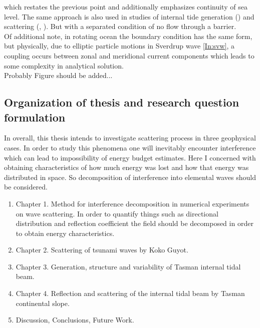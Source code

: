 which restates the previous point and additionally emphasizes continuity of sea level. The same approach is also used in studies of internal tide generation (\cite{st2002role}) and scattering (\cite{larsen1969internal}, \cite{chapman1981scattering}). But with a separated condition of no flow through a barrier.\\
Of additional note, in rotating ocean the boundary condition has the same form, but physically, due to elliptic particle motions in Sverdrup wave \eqref{In:svw}, a coupling occurs between zonal and meridional current components \cite{greenspan1968theory} which leads to some complexity in analytical solution.\\
Probably Figure should be added...

\subsection{Organization of thesis and research question formulation}
In overall, this thesis intends to investigate scattering process in three geophysical cases. In order to study this phenomena one will inevitably encounter interference which can lead to impossibility of energy budget estimates. Here I concerned with obtaining characteristics of how much energy was lost and how that energy was distributed in space. So decomposition of interference into elemental waves should be considered.\\

\begin{enumerate}
\item Chapter 1. Method for interference decomposition in numerical experiments on wave scattering.
In order to quantify things such as directional distribution and reflection coefficient the field should be decomposed in order to obtain energy characteristics.

\item Chapter 2. Scattering of tsunami waves by Koko Guyot.
\item Chapter 3. Generation, structure and variability of Tasman internal tidal beam.
\item Chapter 4. Reflection and scattering of the internal tidal beam by Tasman continental slope.
\item Discussion, Conclusions, Future Work.
\end{enumerate}

\newpage




